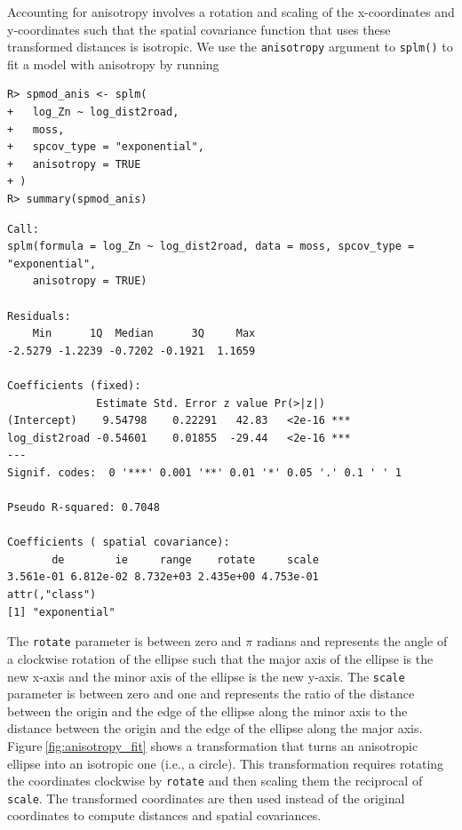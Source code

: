 \documentclass[10pt,letterpaper]{article}
\begin{document}
Accounting for anisotropy involves a rotation and scaling of the
x-coordinates and y-coordinates such that the spatial covariance
function that uses these transformed distances is isotropic. We use the
\texttt{anisotropy} argument to \texttt{splm()} to fit a model with
anisotropy by running

\begin{verbatim}
R> spmod_anis <- splm(
+   log_Zn ~ log_dist2road,
+   moss,
+   spcov_type = "exponential",
+   anisotropy = TRUE
+ )
R> summary(spmod_anis)
\end{verbatim}

\begin{verbatim}
Call:
splm(formula = log_Zn ~ log_dist2road, data = moss, spcov_type = "exponential", 
    anisotropy = TRUE)

Residuals:
    Min      1Q  Median      3Q     Max 
-2.5279 -1.2239 -0.7202 -0.1921  1.1659 

Coefficients (fixed):
              Estimate Std. Error z value Pr(>|z|)    
(Intercept)    9.54798    0.22291   42.83   <2e-16 ***
log_dist2road -0.54601    0.01855  -29.44   <2e-16 ***
---
Signif. codes:  0 '***' 0.001 '**' 0.01 '*' 0.05 '.' 0.1 ' ' 1

Pseudo R-squared: 0.7048

Coefficients ( spatial covariance):
       de        ie     range    rotate     scale 
3.561e-01 6.812e-02 8.732e+03 2.435e+00 4.753e-01 
attr(,"class")
[1] "exponential"
\end{verbatim}

The \texttt{rotate} parameter is between zero and \(\pi\) radians and
represents the angle of a clockwise rotation of the ellipse such that
the major axis of the ellipse is the new x-axis and the minor axis of
the ellipse is the new y-axis. The \texttt{scale} parameter is between
zero and one and represents the ratio of the distance between the origin
and the edge of the ellipse along the minor axis to the distance between
the origin and the edge of the ellipse along the major axis.
Figure\(~\)\ref{fig:anisotropy_fit} shows a transformation that turns an
anisotropic ellipse into an isotropic one (i.e., a circle). This
transformation requires rotating the coordinates clockwise by
\texttt{rotate} and then scaling them the reciprocal of \texttt{scale}.
The transformed coordinates are then used instead of the original
coordinates to compute distances and spatial covariances.
\end{document}
